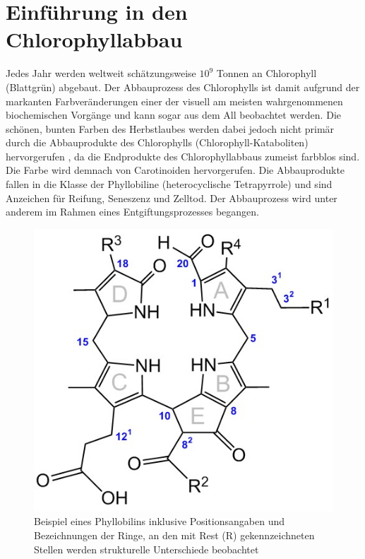 \documentclass[12pt,a4paper]{article}
\begin{document}
\section{Einführung in den Chlorophyllabbau}

Jedes Jahr werden weltweit schätzungsweise $10^{9}$ Tonnen an Chlorophyll (Blattgrün) abgebaut. Der Abbauprozess des Chlorophylls ist damit aufgrund der markanten Farbveränderungen einer der visuell am meisten wahrgenommenen biochemischen Vorgänge und kann sogar aus dem All beobachtet werden. \cite{ChlorophyllBreakdown} Die schönen, bunten Farben des Herbstlaubes werden dabei jedoch nicht primär durch die Abbauprodukte des Chlorophylls (Chlorophyll-Kataboliten) hervorgerufen  \cite{DegradationChlorophyll}, da die Endprodukte des Chlorophyllabbaus zumeist farbblos sind. Die Farbe wird demnach von Carotinoiden hervorgerufen. \cite{ChlorophyllBreakdown} Die Abbauprodukte fallen in die Klasse der Phyllobiline (heterocyclische Tetrapyrrole) und sind Anzeichen für Reifung, Seneszenz und Zelltod. Der Abbauprozess wird unter anderem im Rahmen eines Entgiftungsprozesses begangen. \cite{ChlorophyllKatabolitenalsZeichenReifung}

\begin{figure}[!hbtp]
  \centering
  \includegraphics[scale=0.5]{figures/Kapitel2/VWA_Chl-Nummerierung.png}
  \caption[Nummerierung von Phyllobilinen, Quelle: Autor]{Beispiel eines Phyllobilins inklusive Positionsangaben und Bezeichnungen der Ringe, an den mit Rest (R) gekennzeichneten Stellen werden strukturelle Unterschiede beobachtet}
  \label{fig:NummerierungPhyllobiline}
\end{figure}
\end{document}

